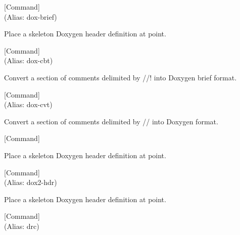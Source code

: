 \vspace{1em}
\noindent
{}
\usebox{\funcname}
 \hfill [Command]\\%
 (Alias: dox-brief)

\begin{doc-string}
Place a skeleton Doxygen header definition at point.
\end{doc-string}

\vspace{1em}
\noindent
{}
\usebox{\funcname}
 \hfill [Command]\\%
 (Alias: dox-cbt)

\begin{doc-string}
Convert a section of comments delimited by //! into Doxygen brief format.
\end{doc-string}

\vspace{1em}
\noindent
{}
\usebox{\funcname}
 \hfill [Command]\\%
 (Alias: dox-cvt)

\begin{doc-string}
Convert a section of comments delimited by // into Doxygen format.
\end{doc-string}

\vspace{1em}
\noindent
{}
\usebox{\funcname}
 \hfill [Command]

\begin{doc-string}
Place a skeleton Doxygen header definition at point.
\end{doc-string}

\vspace{1em}
\noindent
{}
\usebox{\funcname}
 \hfill [Command]\\%
 (Alias: dox2-hdr)

\begin{doc-string}
Place a skeleton Doxygen header definition at point.
\end{doc-string}

\vspace{1em}
\noindent
{}
\usebox{\funcname}
 \hfill [Command]\\%
 (Alias: drc)

